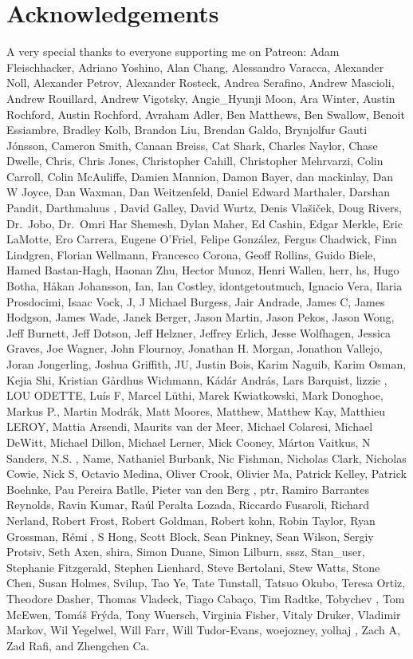 \documentclass[
  letterpaper,
  DIV=11,
  numbers=noendperiod]{scrartcl}
\begin{document}
\hypertarget{acknowledgements}{%
\section*{Acknowledgements}\label{acknowledgements}}

A very special thanks to everyone supporting me on Patreon: Adam
Fleischhacker, Adriano Yoshino, Alan Chang, Alessandro Varacca,
Alexander Noll, Alexander Petrov, Alexander Rosteck, Andrea Serafino,
Andrew Mascioli, Andrew Rouillard, Andrew Vigotsky, Angie\_Hyunji Moon,
Ara Winter, Austin Rochford, Austin Rochford, Avraham Adler, Ben
Matthews, Ben Swallow, Benoit Essiambre, Bradley Kolb, Brandon Liu,
Brendan Galdo, Brynjolfur Gauti Jónsson, Cameron Smith, Canaan Breiss,
Cat Shark, Charles Naylor, Chase Dwelle, Chris, Chris Jones, Christopher
Cahill, Christopher Mehrvarzi, Colin Carroll, Colin McAuliffe, Damien
Mannion, Damon Bayer, dan mackinlay, Dan W Joyce, Dan Waxman, Dan
Weitzenfeld, Daniel Edward Marthaler, Darshan Pandit, Darthmaluus ,
David Galley, David Wurtz, Denis Vlašiček, Doug Rivers, Dr.~Jobo,
Dr.~Omri Har Shemesh, Dylan Maher, Ed Cashin, Edgar Merkle, Eric
LaMotte, Ero Carrera, Eugene O'Friel, Felipe González, Fergus Chadwick,
Finn Lindgren, Florian Wellmann, Francesco Corona, Geoff Rollins, Guido
Biele, Hamed Bastan-Hagh, Haonan Zhu, Hector Munoz, Henri Wallen, herr,
hs, Hugo Botha, Håkan Johansson, Ian, Ian Costley, idontgetoutmuch,
Ignacio Vera, Ilaria Prosdocimi, Isaac Vock, J, J Michael Burgess, Jair
Andrade, James C, James Hodgson, James Wade, Janek Berger, Jason Martin,
Jason Pekos, Jason Wong, Jeff Burnett, Jeff Dotson, Jeff Helzner,
Jeffrey Erlich, Jesse Wolfhagen, Jessica Graves, Joe Wagner, John
Flournoy, Jonathan H. Morgan, Jonathon Vallejo, Joran Jongerling, Joshua
Griffith, JU, Justin Bois, Karim Naguib, Karim Osman, Kejia Shi,
Kristian Gårdhus Wichmann, Kádár András, Lars Barquist, lizzie , LOU
ODETTE, Luís F, Marcel Lüthi, Marek Kwiatkowski, Mark Donoghoe, Markus
P., Martin Modrák, Matt Moores, Matthew, Matthew Kay, Matthieu LEROY,
Mattia Arsendi, Maurits van der Meer, Michael Colaresi, Michael DeWitt,
Michael Dillon, Michael Lerner, Mick Cooney, Márton Vaitkus, N Sanders,
N.S. , Name, Nathaniel Burbank, Nic Fishman, Nicholas Clark, Nicholas
Cowie, Nick S, Octavio Medina, Oliver Crook, Olivier Ma, Patrick Kelley,
Patrick Boehnke, Pau Pereira Batlle, Pieter van den Berg , ptr, Ramiro
Barrantes Reynolds, Ravin Kumar, Raúl Peralta Lozada, Riccardo Fusaroli,
Richard Nerland, Robert Frost, Robert Goldman, Robert kohn, Robin
Taylor, Ryan Grossman, Rémi , S Hong, Scott Block, Sean Pinkney, Sean
Wilson, Sergiy Protsiv, Seth Axen, shira, Simon Duane, Simon Lilburn,
sssz, Stan\_user, Stephanie Fitzgerald, Stephen Lienhard, Steve
Bertolani, Stew Watts, Stone Chen, Susan Holmes, Svilup, Tao Ye, Tate
Tunstall, Tatsuo Okubo, Teresa Ortiz, Theodore Dasher, Thomas Vladeck,
Tiago Cabaço, Tim Radtke, Tobychev , Tom McEwen, Tomáš Frýda, Tony
Wuersch, Virginia Fisher, Vitaly Druker, Vladimir Markov, Wil Yegelwel,
Will Farr, Will Tudor-Evans, woejozney, yolhaj , Zach A, Zad Rafi, and
Zhengchen Ca.
\end{document}
